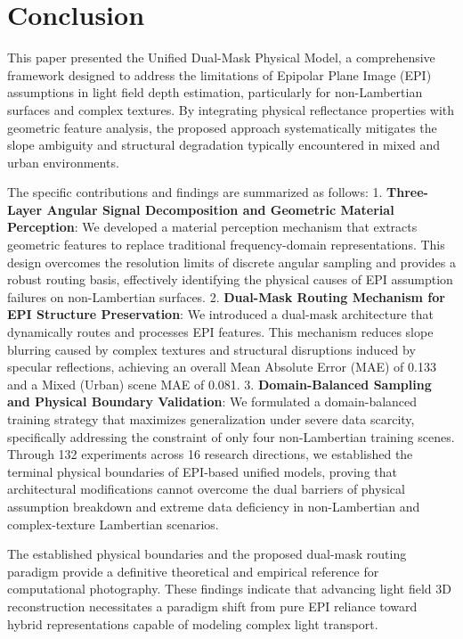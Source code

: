 \section{Conclusion}


This paper presented the Unified Dual-Mask Physical Model, a comprehensive framework designed to address the limitations of Epipolar Plane Image (EPI) assumptions in light field depth estimation, particularly for non-Lambertian surfaces and complex textures. By integrating physical reflectance properties with geometric feature analysis, the proposed approach systematically mitigates the slope ambiguity and structural degradation typically encountered in mixed and urban environments. 

The specific contributions and findings are summarized as follows:
1. \textbf{Three-Layer Angular Signal Decomposition and Geometric Material Perception}: We developed a material perception mechanism that extracts geometric features to replace traditional frequency-domain representations. This design overcomes the resolution limits of discrete angular sampling and provides a robust routing basis, effectively identifying the physical causes of EPI assumption failures on non-Lambertian surfaces.
2. \textbf{Dual-Mask Routing Mechanism for EPI Structure Preservation}: We introduced a dual-mask architecture that dynamically routes and processes EPI features. This mechanism reduces slope blurring caused by complex textures and structural disruptions induced by specular reflections, achieving an overall Mean Absolute Error (MAE) of 0.133 and a Mixed (Urban) scene MAE of 0.081.
3. \textbf{Domain-Balanced Sampling and Physical Boundary Validation}: We formulated a domain-balanced training strategy that maximizes generalization under severe data scarcity, specifically addressing the constraint of only four non-Lambertian training scenes. Through 132 experiments across 16 research directions, we established the terminal physical boundaries of EPI-based unified models, proving that architectural modifications cannot overcome the dual barriers of physical assumption breakdown and extreme data deficiency in non-Lambertian and complex-texture Lambertian scenarios.

The established physical boundaries and the proposed dual-mask routing paradigm provide a definitive theoretical and empirical reference for computational photography. These findings indicate that advancing light field 3D reconstruction necessitates a paradigm shift from pure EPI reliance toward hybrid representations capable of modeling complex light transport.


